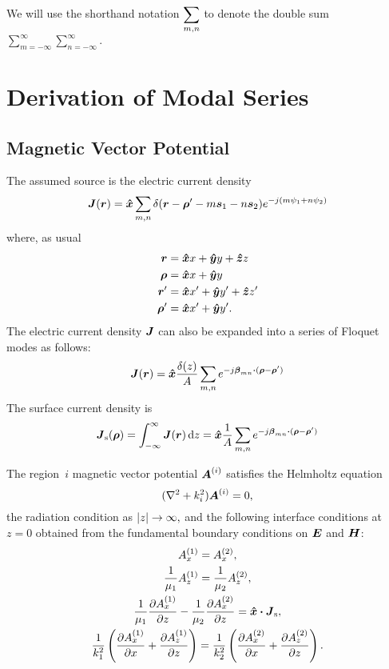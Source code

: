 We will use the shorthand notation $\displaystyle \sum_{m,n}$ to denote
the double sum $\displaystyle \sum_{m=-\infty}^{\infty} \sum_{n=-\infty}^{\infty}.$



\section{Derivation of Modal Series}
\subsection{Magnetic Vector Potential}

The assumed source is the electric current density
\begin{equation}
  \label{eq:J}
  \boldsymbol{J}(\boldsymbol{r}) = \boldsymbol{\hat{x}}  \sum_{m,n} 
  \delta(\boldsymbol{r}-\boldsymbol{\rho}'-m\boldsymbol{s}_1 -n\boldsymbol{s}_2) e^{-j(m\psi_1 + n\psi_2)}
\end{equation}
where, as usual
\begin{subequations}
  \begin{align}
    \boldsymbol{r} &= \boldsymbol{\hat{x}} x + \boldsymbol{\hat{y}} y + \boldsymbol{\hat{z}} z \\
    \boldsymbol{\rho} &= \boldsymbol{\hat{x}} x + \boldsymbol{\hat{y}} y \\
    \boldsymbol{r}' &= \boldsymbol{\hat{x}} x' + \boldsymbol{\hat{y}} y' + \boldsymbol{\hat{z}} z' \\
    \boldsymbol{\rho}' &= \boldsymbol{\hat{x}} x' + \boldsymbol{\hat{y}} y'. 
  \end{align}
\end{subequations}
The electric current density $\boldsymbol{J}$
can also be expanded into a series of Floquet modes as follows:
\begin{equation}
  \label{eq:Jfloquet}
  \boldsymbol{J}(\boldsymbol{r}) = 
  \boldsymbol{\hat{x}} \frac{\delta(z)}{A} \sum_{m,n} e^{-j\boldsymbol{\beta}_{mn} \boldsymbol{\cdot} (\boldsymbol{\rho}-\boldsymbol{\rho}')}
\end{equation}
The surface current density is 
\begin{equation}
  \boldsymbol{J}_{\text{s}}(\boldsymbol{\rho}) = \int_{-\infty}^{\infty} \boldsymbol{J}(\boldsymbol{r}) \, \text{d} z 
  = \boldsymbol{\hat{x}} \frac{1}{A} \sum_{m,n}  e^{-j\boldsymbol{\beta}_{mn} \boldsymbol{\cdot} (\boldsymbol{\rho}-\boldsymbol{\rho}')}
\end{equation}


The region~$i$ magnetic vector potential 
 $\boldsymbol{A}^{(i)}$ satisfies the Helmholtz equation
 \begin{equation}
   \label{eq:Ahelmholtz}
   (\nabla^2 + k_i^2) \boldsymbol{A}^{(i)} = 0,
 \end{equation}
the radiation condition as $\lvert z\rvert \rightarrow \infty,$
and the following interface conditions at $z=0$ obtained from the fundamental
boundary conditions on $\boldsymbol{E}$ and $\boldsymbol{H}$:
\begin{subequations}
  \begin{gather}
    A^{(1)}_x = A^{(2)}_x, \label{eq:Abc:a} \\
    \frac{1}{\mu_1} A^{(1)}_z = \frac{1}{\mu_2} A^{(2)}_z, \label{eq:Abc:b} \\
    \frac{1}{\mu_1}  \frac{\partial A^{(1)}_x}{\partial z} - \frac{1}{\mu_2} \frac{\partial A^{(2)}_x}{\partial z} 
    = \boldsymbol{\hat{x}} \boldsymbol{\cdot} \boldsymbol{J}_{\text{s}}, \label{eq:Abc:c} \\
    \frac{1}{k_1^2} 
    \left(
      \frac{\partial A^{(1)}_x}{\partial x} + \frac{\partial A^{(1)}_z}{\partial z}
    \right)
    =
    \frac{1}{k_2^2} 
    \left(
      \frac{\partial A^{(2)}_x}{\partial x} + \frac{\partial A^{(2)}_z}{\partial z}
    \right). \label{eq:Abc:d}
  \end{gather}
\end{subequations}

